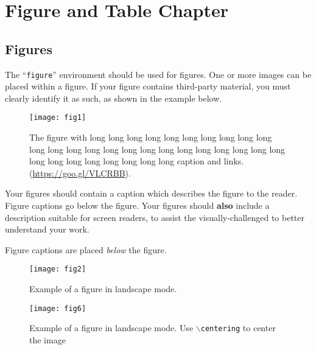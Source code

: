 \chapter{Figure and Table Chapter}
\lipsum[5]
\section{Figures}

The ``\verb|figure|'' environment should be used for figures. One or
more images can be placed within a figure. If your figure contains
third-party material, you must clearly identify it as such, as shown
in the example below.
\begin{figure}[h]
	\centering
	\texttt{[image: fig1]}
	\caption{The figure with long long long long long long long long long long long long long long long long long long long long long long long long long long long long long long long long caption and links. (\url{https://goo.gl/VLCRBB}).}
\end{figure}




Your figures should contain a caption which describes the figure to
the reader. Figure captions go below the figure. Your figures should
{\bfseries also} include a description suitable for screen readers, to
assist the visually-challenged to better understand your work.

Figure captions are placed {\itshape below} the figure.

\lipsum[1-2]

\begin{pdflandscape} %
	\begin{figure}[h]
		\centering
		\texttt{[image: fig2]}
		\caption{Example of a figure in landscape mode.}
	\end{figure}
\end{pdflandscape}
\begin{pdflandscape} %
	\begin{figure}[h]
		\centering
		\texttt{[image: fig6]}
		\caption{Example of a figure in landscape mode. Use \texttt{$\backslash$centering} to center the image}
	\end{figure}
\end{pdflandscape}



